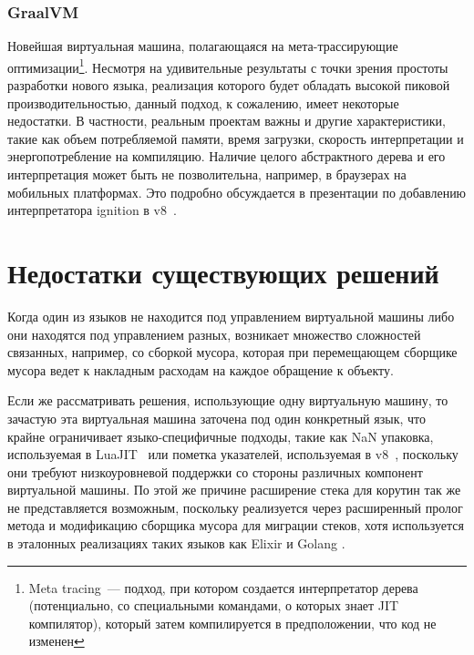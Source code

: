 \documentclass[times
,titlepage
]{itmo-student-thesis}
\begin{document}
\subsubsection{GraalVM}
Новейшая виртуальная машина, полагающаяся на мета-трассирующие оптимизации\footnote{Meta tracing~--- подход, при котором создается интерпретатор дерева (потенциально, со специальными командами, о которых знает JIT компилятор), который затем компилируется в предположении, что код не изменен}. Несмотря на удивительные результаты с точки зрения простоты разработки нового языка, реализация которого будет обладать высокой пиковой производительностью, данный подход, к сожалению, имеет некоторые недостатки. В частности, реальным проектам важны и другие характеристики, такие как объем потребляемой памяти, время загрузки, скорость интерпретации и энергопотребление на компиляцию. Наличие целого абстрактного дерева и его интерпретация может быть не позволительна, например, в браузерах на мобильных платформах. Это подробно обсуждается в презентации по добавлению интерпретатора ignition в v8~\cite{ignition-iterpreter}.

\section{Недостатки существующих решений}
Когда один из языков не находится под управлением виртуальной машины либо они находятся под управлением разных, возникает множество сложностей связанных, например, со сборкой мусора, которая при перемещающем сборщике мусора ведет к накладным расходам на каждое обращение к объекту.

Если же рассматривать решения, использующие одну виртуальную машину, то зачастую эта виртуальная машина заточена под один конкретный язык, что крайне ограничивает языко-специфичные подходы, такие как NaN упаковка, используемая в LuaJIT~\cite{luajit-nan-box} или пометка указателей, используемая в v8~\cite{v8-pointer-tagging}, поскольку они требуют низкоуровневой поддержки со стороны различных компонент виртуальной машины. По этой же причине расширение стека для корутин так же не представляется возможным, поскольку реализуется через расширенный пролог метода и модификацию сборщика мусора для миграции стеков, хотя используется в эталонных реализациях таких языков как Elixir и Golang \cite{golang-stack}.

\finishrelatedwork
\end{document}
